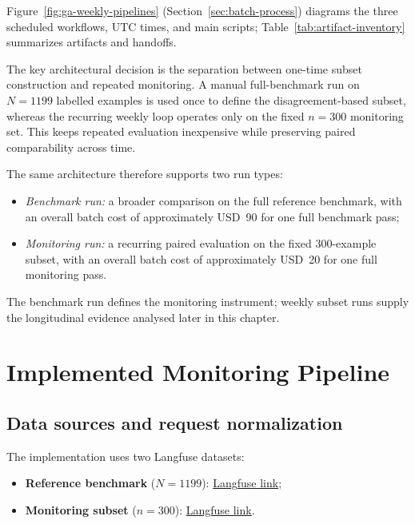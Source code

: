 Figure~\ref{fig:ga-weekly-pipelines} (Section~\ref{sec:batch-process}) diagrams the three scheduled workflows, UTC times, and main scripts; Table~\ref{tab:artifact-inventory} summarizes artifacts and handoffs.

The key architectural decision is the separation between one-time subset construction and repeated monitoring. A manual full-benchmark run on \(N=1199\) labelled examples is used once to define the disagreement-based subset, whereas the recurring weekly loop operates only on the fixed \(n=300\) monitoring set. This keeps repeated evaluation inexpensive while preserving paired comparability across time.

The same architecture therefore supports two run types:
\begin{itemize}
    \item \emph{Benchmark run:} a broader comparison on the full reference benchmark, with an overall batch cost of approximately USD~90 for one full benchmark pass;
    \item \emph{Monitoring run:} a recurring paired evaluation on the fixed 300-example subset, with an overall batch cost of approximately USD~20 for one full monitoring pass.
\end{itemize}

The benchmark run defines the monitoring instrument; weekly subset runs supply the longitudinal evidence analysed later in this chapter.

\section{Implemented Monitoring Pipeline}

\subsection{Data sources and request normalization}
\label{sec:dataset-storage}

The implementation uses two Langfuse datasets:
\begin{itemize}
    \item \textbf{Reference benchmark} (\(N=1199\)): \href{https://cloud.langfuse.com/project/cmkqnvv3z016aad08kqtjim2n/datasets/cmlfi3uo0003yad07e75cd7e3}{Langfuse link};
    \item \textbf{Monitoring subset} (\(n=300\)): \href{https://cloud.langfuse.com/project/cmkqnvv3z016aad08kqtjim2n/datasets/cmmjjduz501c6ad07vbuln8m8/items}{Langfuse link}.
\end{itemize}


